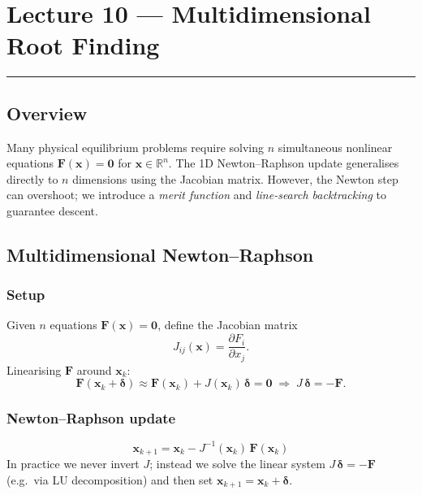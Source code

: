 
\section{Lecture 10 — Multidimensional Root Finding}\label{sec:lec10}
\hrule\vspace{1.5em}

\subsection*{Overview}
Many physical equilibrium problems require solving $n$ simultaneous
nonlinear equations $\mathbf{F}(\mathbf{x})=\mathbf{0}$ for
$\mathbf{x}\in\mathbb{R}^n$.  The 1D Newton–Raphson update generalises
directly to $n$ dimensions using the Jacobian matrix.  However, the
Newton step can overshoot; we introduce a \emph{merit function} and
\emph{line-search backtracking} to guarantee descent.

\subsection{Multidimensional Newton--Raphson}\label{subsec:lec10:newtonraphson}

\subsubsection*{Setup}
Given $n$ equations $\mathbf{F}(\mathbf{x})=\mathbf{0}$, define the
Jacobian matrix
\begin{equation}
  J_{ij}(\mathbf{x}) = \frac{\partial F_i}{\partial x_j}.
  \label{eq:lec10:jacobian}
\end{equation}
Linearising $\mathbf{F}$ around $\mathbf{x}_k$:
\begin{equation}
  \mathbf{F}(\mathbf{x}_k + \boldsymbol{\delta}) \approx
  \mathbf{F}(\mathbf{x}_k) + J(\mathbf{x}_k)\,\boldsymbol{\delta} = \mathbf{0}
  \;\Rightarrow\;
  J\,\boldsymbol{\delta} = -\mathbf{F}.
  \label{eq:lec10:linear}
\end{equation}

\subsubsection*{Newton--Raphson update}
\begin{equation}
  \boxed{\mathbf{x}_{k+1} = \mathbf{x}_k - J^{-1}(\mathbf{x}_k)\,\mathbf{F}(\mathbf{x}_k)}
  \label{eq:lec10:NR}
\end{equation}
In practice we never invert $J$; instead we solve the linear system
$J\,\boldsymbol{\delta} = -\mathbf{F}$ (e.g.\ via LU decomposition)
and then set $\mathbf{x}_{k+1} = \mathbf{x}_k + \boldsymbol{\delta}$.

